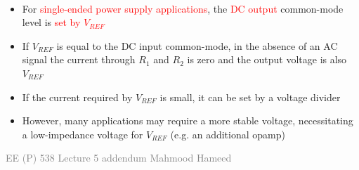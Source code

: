\documentclass[11pt, landscape]{article}
\begin{document}
\\[0.8cm]

\begin{minipage}[t]{0.48\textwidth}
    \begin{itemize}[itemsep=1.5ex, leftmargin=*]
        \item \Large For \textcolor{red}{single-ended power supply applications}, the \textcolor{red}{DC output} common-mode level is \textcolor{red}{set by $V_{REF}$}
        \item If $V_{REF}$ is equal to the DC input common-mode, in the absence of an AC signal the current through $R_1$ and $R_2$ is zero and the output voltage is also $V_{REF}$
        \item If the current required by $V_{REF}$ is small, it can be set by a voltage divider
        \item However, many applications may require a more stable voltage, necessitating a low-impedance voltage for $V_{REF}$ (e.g. an additional opamp)
    \end{itemize}
    
    \vspace{4cm}
    \textcolor{gray}{\small EE (P) 538 Lecture 5 addendum \hspace{3cm} Mahmood Hameed}
\end{minipage}%
\hfill
\end{document}
